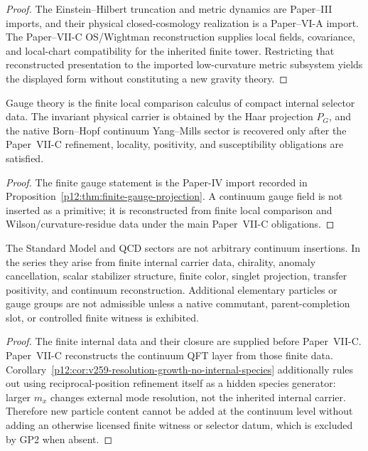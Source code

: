 \documentclass[12pt,a4paper]{article}
\begin{document}
\begin{proof}
The Einstein--Hilbert truncation and metric dynamics are Paper--III imports, and their physical closed-cosmology realization is a Paper--VI-A import.  The Paper--VII-C OS/Wightman reconstruction supplies local fields, covariance, and local-chart compatibility for the inherited finite tower.  Restricting that reconstructed presentation to the imported low-curvature metric subsystem yields the displayed form without constituting a new gravity theory.
\end{proof}

\begin{proposition}
\label{p12:prop:gauge-ym-subsystem}
Gauge theory is the finite local comparison calculus of compact internal selector data.  The invariant physical carrier is obtained by the Haar projection \(P_G\), and the native Born--Hopf continuum Yang--Mills sector is recovered only after the Paper~VII-C refinement, locality, positivity, and susceptibility obligations are satisfied.
\end{proposition}

\begin{proof}
The finite gauge statement is the Paper-IV import recorded in Proposition~\ref{p12:thm:finite-gauge-projection}.  A continuum gauge field is not inserted as a primitive; it is reconstructed from finite local comparison and Wilson/curvature-residue data under the main Paper~VII-C obligations.
\end{proof}

\begin{proposition}
\label{p12:prop:sm-qcd-subsystems}
The Standard Model and QCD sectors are not arbitrary continuum insertions.  In the series they arise from finite internal carrier data, chirality, anomaly cancellation, scalar stabilizer structure, finite color, singlet projection, transfer positivity, and continuum reconstruction.  Additional elementary particles or gauge groups are not admissible unless a native commutant, parent-completion slot, or controlled finite witness is exhibited.
\end{proposition}

\begin{proof}
The finite internal data and their closure are supplied before Paper~VII-C.  Paper~VII-C reconstructs the continuum QFT layer from those finite data.  Corollary~\ref{p12:cor:v259-resolution-growth-no-internal-species} additionally rules out using reciprocal-position refinement itself as a hidden species generator: larger $m_x$ changes external mode resolution, not the inherited internal carrier.  Therefore new particle content cannot be added at the continuum level without adding an otherwise licensed finite witness or selector datum, which is excluded by GP2 when absent.
\end{proof}
\end{document}
